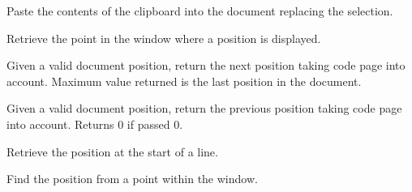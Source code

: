 \label{wxstyledtextctrlparadownextend}



\label{wxstyledtextctrlparaup}



\label{wxstyledtextctrlparaupextend}



\label{wxstyledtextctrlpaste}


Paste the contents of the clipboard into the document replacing the selection.


\label{wxstyledtextctrlpointfromposition}


Retrieve the point in the window where a position is displayed.


\label{wxstyledtextctrlpositionafter}


Given a valid document position, return the next position taking code
page into account. Maximum value returned is the last position in the document.


\label{wxstyledtextctrlpositionbefore}


Given a valid document position, return the previous position taking code
page into account. Returns 0 if passed 0.


\label{wxstyledtextctrlpositionfromline}


Retrieve the position at the start of a line.


\label{wxstyledtextctrlpositionfrompoint}


Find the position from a point within the window.


